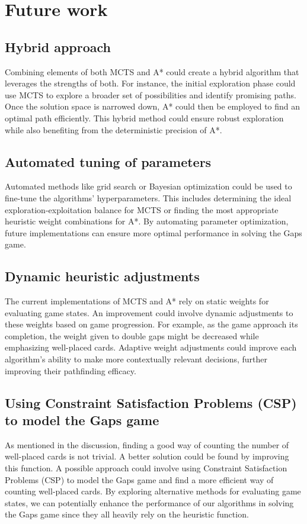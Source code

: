 \chapter{Future work}
\section{Hybrid approach}
Combining elements of both MCTS and A* could create a hybrid algorithm that leverages the strengths of both. For instance, the initial exploration phase could use MCTS to explore a broader set of possibilities and identify promising paths. Once the solution space is narrowed down, A* could then be employed to find an optimal path efficiently. This hybrid method could ensure robust exploration while also benefiting from the deterministic precision of A*.

\section{Automated tuning of parameters}
Automated methods like grid search or Bayesian optimization could be used to fine-tune the algorithms' hyperparameters. This includes determining the ideal exploration-exploitation balance for MCTS or finding the most appropriate heuristic weight combinations for A*. By automating parameter optimization, future implementations can ensure more optimal performance in solving the Gaps game.

\section{Dynamic heuristic adjustments}
The current implementations of MCTS and A* rely on static weights for evaluating game states. An improvement could involve dynamic adjustments to these weights based on game progression. For example, as the game approach its completion, the weight given to double gaps might be decreased while emphasizing well-placed cards. Adaptive weight adjustments could improve each algorithm's ability to make more contextually relevant decisions, further improving their pathfinding efficacy.

\section{Using Constraint Satisfaction Problems (CSP) to model the Gaps game}
As mentioned in the discussion, finding a good way of counting the number of well-placed cards is not trivial. A better solution could be found by improving this function. A possible approach could involve using Constraint Satisfaction Problems (CSP) to model the Gaps game and find a more efficient way of counting well-placed cards. By exploring alternative methods for evaluating game states, we can potentially enhance the performance of our algorithms in solving the Gaps game since they all heavily rely on the heuristic function.


